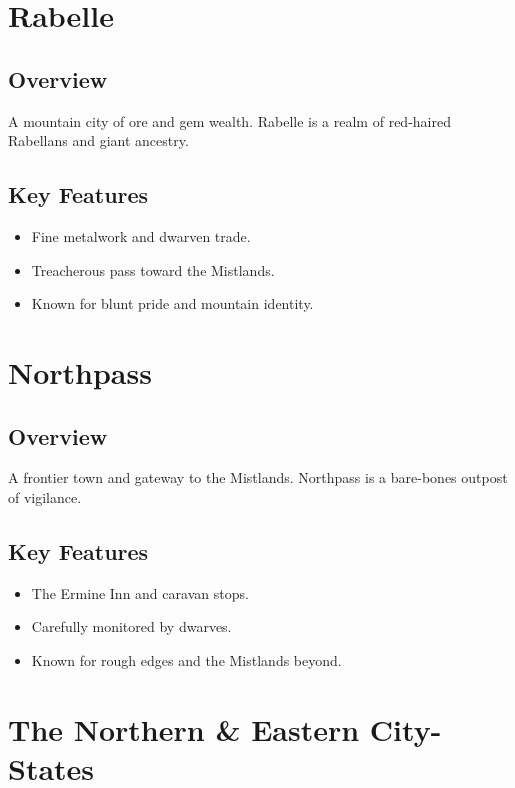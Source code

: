 \section{Rabelle}
\label{sec:lore-rabelle}

\subsection*{Overview}
A mountain city of ore and gem wealth. Rabelle is a realm of red-haired Rabellans and giant ancestry.

\subsection*{Key Features}
\begin{itemize}[leftmargin=*]
    \item Fine metalwork and dwarven trade.
    \item Treacherous pass toward the Mistlands.
    \item Known for blunt pride and mountain identity.
\end{itemize}

\section{Northpass}
\label{sec:lore-northpass}

\subsection*{Overview}
A frontier town and gateway to the Mistlands. Northpass is a bare-bones outpost of vigilance.

\subsection*{Key Features}
\begin{itemize}[leftmargin=*]
    \item The Ermine Inn and caravan stops.
    \item Carefully monitored by dwarves.
    \item Known for rough edges and the Mistlands beyond.
\end{itemize}

\section{The Northern \& Eastern City-States}
\label{sec:lore-city-states}

